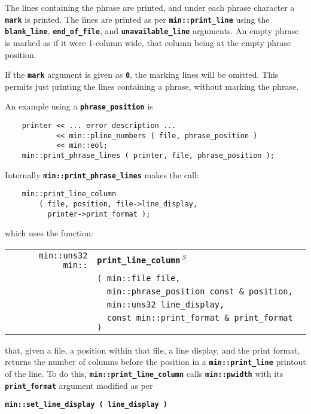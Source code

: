 \documentclass[12pt]{article}
\makeatletter
\newcommand{\TT}[1]{{\tt \bfseries #1}}
\newcommand{\ttindex}[1]{\index{#1@{\tt #1}}}
\newcommand{\EOL}{\penalty \exhyphenpenalty}
\newenvironment{indpar}[1][0.3in]%
	{\begin{list}{}%
		     {\setlength{\itemsep}{0in}%
		      \setlength{\topsep}{0in}%
		      \setlength{\parsep}{1ex}%
		      \setlength{\labelwidth}{#1}%
		      \setlength{\leftmargin}{#1}%
		      \addtolength{\leftmargin}{\labelsep}}%
	 \item}%
	{\end{list}}
\newcommand{\LABEL}[1]{\label{#1}}
\newlength{\ARGBREAKLENGTH}
\newcommand{\ARGBREAK}[1][\ARGBREAKLENGTH]{\\&\hspace*{#1}}
\newcommand{\MINKEY}[1]%
	   {\TT{#1}\ttindex{min::#1}\ttindex{#1}}
\newcommand{\RESIZE}{$\,^S$}
\makeatother
\begin{document}
The lines containing the phrase are printed, and under each phrase
character a \TT{mark} is printed.  The lines are printed
as per \TT{min::\EOL print\_\EOL line} using the
\TT{blank\_\EOL line},
\TT{end\_\EOL of\_\EOL file}, and
\TT{unavailable\_\EOL line} arguments.
An empty phrase is marked as if it were 1-column wide, that column
being at the empty phrase position.

If the \TT{mark} argument is given as \TT{0}, the marking lines
will be omitted.  This permits just printing the lines containing
a phrase, without marking the phrase.

An example using a \TT{phrase\_position} is

\begin{indpar}\begin{verbatim}
    printer << ... error description ...
            << min::pline_numbers ( file, phrase_position )
            << min::eol;
    min::print_phrase_lines ( printer, file, phrase_position );
\end{verbatim}\end{indpar}

Internally \TT{min::\EOL print\_\EOL phrase\_\EOL lines}
makes the call:

\begin{indpar}\begin{verbatim}
    min::print_line_column
        ( file, position, file->line_display,
          printer->print_format );
\end{verbatim}\end{indpar}

which uses the function:

\begin{indpar}[1em]\begin{tabular}{r@{}l}
\verb|min::uns32 min::|
    & \MINKEY{print\_\EOL line\_\EOL column\RESIZE}\ARGBREAK
      \verb|( min::file file,|\ARGBREAK
      \verb|  min::phrase_position const & position,|\ARGBREAK
      \verb|  min::uns32 line_display,|\ARGBREAK
      \verb|  const min::print_format & print_format )|
\LABEL{MIN::PRINT_LINE_COLUMN} \\
\end{tabular}\end{indpar}

that, given a file, a position within that file, a line display,
and the print format, returns the number of
columns before the position in a \TT{min::\EOL print\_\EOL line}
printout of the line.  To do this, \TT{min::\EOL print\_\EOL line\_\EOL column}
calls \TT{min::\EOL pwidth} with its \TT{print\_\EOL format} argument modified
as per
\begin{center}
\TT{min::set\_line\_display ( line\_display )}
\end{center}
\end{document}
